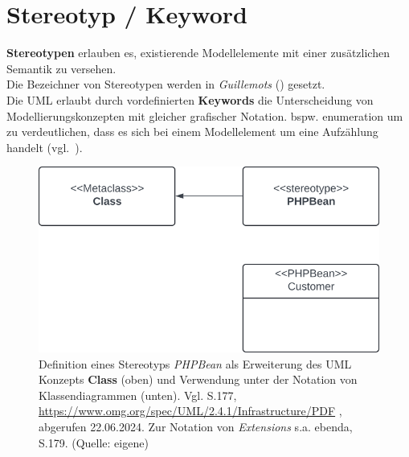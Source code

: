 \section{Stereotyp / Keyword}

\begin{tcolorbox}[title=Konzept der Stereotypen]
    \textbf{Stereotypen} erlauben es, existierende Modellelemente mit einer zusätzlichen Semantik zu versehen. \\
    Die Bezeichner von Stereotypen werden in \textit{Guillemots} (\guillemotleft \guillemotright) gesetzt.\\

    \noindent
    Die UML erlaubt durch vordefinierten \textbf{Keywords} die Unterscheidung von Modellierungskonzepten mit gleicher grafischer Notation.  bspw. \guillemotleft enumeration \guillemotright um zu verdeutlichen, dass es sich bei einem Modellelement um eine Aufzählung handelt (vgl.~\cite[28]{Bal05}).
\end{tcolorbox}


\begin{figure}
    \centering
    \includegraphics[scale=0.4]{chapters/Anhang/CheatSheets/SE3/img/stereotyp}
    \caption{
        Definition eines Stereotyps \textit{PHPBean} als Erweiterung des UML Konzepts \textbf{Class} (oben) und Verwendung unter der Notation von Klassendiagrammen (unten).
        Vgl. S.177, \url{https://www.omg.org/spec/UML/2.4.1/Infrastructure/PDF} , abgerufen 22.06.2024. Zur Notation von \textit{Extensions} s.a. ebenda, S.179.
        (Quelle: eigene)
    }
\end{figure}



